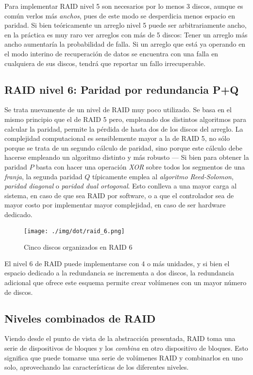 \documentclass[11pt,fleqn]{book} %
\begin{document}
Para implementar RAID nivel 5 son necesarios por lo menos 3 discos,
aunque es común verlos más \emph{anchos}, pues de este modo se desperdicia
menos espacio en paridad. Si bien teóricamente un arreglo nivel 5
puede ser arbitrariamente ancho, en la práctica es muy raro ver
arreglos con más de 5 discos: Tener un arreglo más ancho aumentaría la
probabilidad de falla. Si un arreglo que está ya operando en el modo
interino de recuperación de datos se encuentra con una falla en
cualquiera de sus discos, tendrá que reportar un fallo irrecuperable.
\subsection{RAID nivel 6: Paridad por redundancia P+Q}
\label{sec-10-2-5}


Se trata nuevamente de un nivel de RAID muy poco utilizado. Se basa en
el mismo principio que el de RAID 5 pero, empleando dos distintos
algoritmos para calcular la paridad, permite la pérdida de hasta dos
de los discos del arreglo. La complejidad computacional es
sensiblemente mayor a la de RAID 5, no sólo porque se trata de un
segundo cálculo de paridad, sino porque este cálculo debe hacerse
empleando un algoritmo distinto y más robusto — Si bien para obtener
la paridad $P$ basta con hacer una operación \emph{XOR} sobre todos los
segmentos de una \emph{franja}, la segunda paridad $Q$ típicamente emplea
al \emph{algoritmo Reed-Solomon}, \emph{paridad diagonal} o \emph{paridad dual ortogonal}. Esto conlleva a una mayor carga al sistema, en caso de que
sea RAID por software, o a que el controlador sea de mayor costo por
implementar mayor complejidad, en caso de ser hardware dedicado.

\begin{figure}[htb]
\centering
\texttt{[image: ./img/dot/raid\_6.png]}
\caption{\label{FS_FIS_raid_6}Cinco discos organizados en RAID 6}
\end{figure}

El nivel 6 de RAID puede implementarse con 4 o más unidades, y si
bien el espacio dedicado a la redundancia se incrementa a dos discos,
la redundancia adicional que ofrece este esquema permite crear
volúmenes con un mayor número de discos.
\subsection{Niveles combinados de RAID}
\label{sec-10-2-6}


Viendo desde el punto de vista de la abstracción presentada, RAID
toma una serie de dispositivos de bloques y los \emph{combina} en otro
dispositivo de bloques. Esto significa que puede tomarse una serie de
volúmenes RAID y combinarlos en uno solo, aprovechando las
características de los diferentes niveles.
\end{document}
